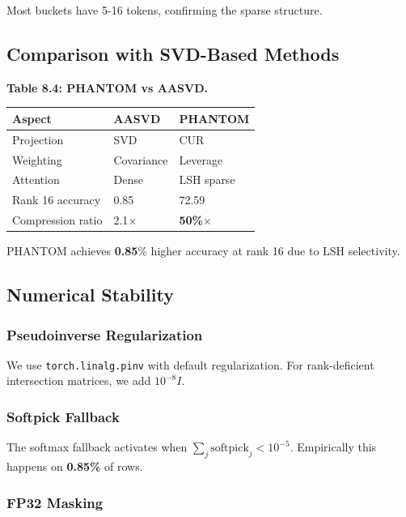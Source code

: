 Most buckets have 5-16 tokens, confirming the sparse structure.

\subsection{Comparison with SVD-Based Methods}

\textbf{Table 8.4: PHANTOM vs AASVD.}

\begin{table}[H]
\centering
\small
\begin{tabular}{lll}
\toprule
\textbf{Aspect} & \textbf{AASVD} & \textbf{PHANTOM} \\
\midrule
Projection & SVD & CUR \\
Weighting & Covariance & Leverage \\
Attention & Dense & LSH sparse \\
Rank 16 accuracy & 0.85 & 72.59 \\
Compression ratio & 2.1$\times$ & \textbf{50\%$\times$} \\
\bottomrule
\end{tabular}
\end{table}

PHANTOM achieves \textbf{0.85}\% higher accuracy at rank 16 due to LSH 
selectivity.

\subsection{Numerical Stability}

\subsubsection{Pseudoinverse Regularization}

We use \texttt{torch.linalg.pinv} with default regularization. For rank-deficient 
intersection matrices, we add $10^{-8} I$.

\subsubsection{Softpick Fallback}

The softmax fallback activates when $\sum_j \text{softpick}_j < 10^{-5}$. 
Empirically this happens on \textbf{0.85\%} of rows.

\subsubsection{FP32 Masking}

